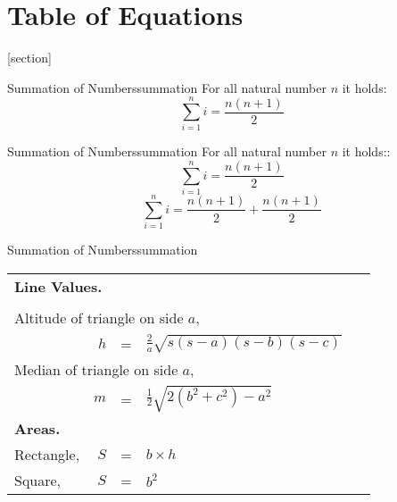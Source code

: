 \documentclass[twocolumn]{article}
\begin{document}
\section{Table of Equations}
[section]
\begin{tcolorbox}[colback=blue!5,colframe=blue!50!black,arc=0mm,
theorem={Equation}{texercise}{Summation}{myMarker}]{Summation of Numbers}{summation}
  For all natural number $n$ it holds:\\[2mm]
  \[\displaystyle\sum\limits_{i=1}^n i = \frac{n(n+1)}{2}\]
\end{tcolorbox}
\begin{tcolorbox}[colback=blue!5,colframe=blue!50!black,arc=0mm,
theorem={Equations}{texercise}{More on summation}{myMarker}]{Summation of Numbers}{summation}
  For all natural number $n$ it holds::\\[2mm]
   \[\displaystyle\sum\limits_{i=1}^n i = \frac{n(n+1)}{2}\]
  \[\displaystyle\sum\limits_{i=1}^n i = \frac{n(n+1)}{2}+ \frac{n(n+1)}{2}\]
\end{tcolorbox}


\begin{tcolorbox}[colback=blue!5,colframe=blue!50!black,arc=0mm,
theorem={Equations}{texercise}{More on summation}{myMarker}]{Summation of Numbers}{summation}
\medskip

\begin{tabular}{lr@{~}c@{~}l@{\qquad}r}
\multicolumn{5}{l}{\hspace{-2ex}\textbf{Line Values.}} \\
\multicolumn{5}{r}{}\\
\multicolumn{4}{l}{Altitude of triangle on side $a$,} \\
& $h$ &=& \( \displaystyle \frac{2}{a}
             \sqrt{s(s-a)(s-b)(s-c)} \) & \\
%
\multicolumn{4}{l}{Median of triangle on side $a$,} \\
& $m$ &=& \( \frac{1}{2} \sqrt{2(b^2+c^2) - a^2} \) & \ \\
\multicolumn{5}{l}{\hspace{-2ex}\textbf{Areas.}} \\
%
Rectangle,     & $S$ &=& $b\times h$ &  \\
Square,         & $S$ &=& $b^2$        &  \\
\end{tabular}
\end{tcolorbox}
\end{document}
